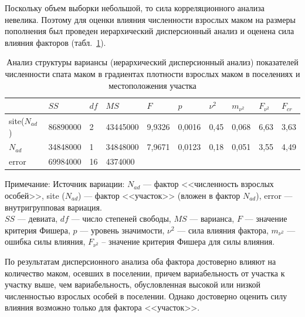 Поскольку объем выборки небольшой, то сила корреляционного анализа невелика. 
Поэтому для оценки влияния численности взрослых маком на размеры пополнения был проведен иерархический дисперсионный анализ и оценена сила влияния факторов (табл.~\ref{tab:ANOVA_site_Nad_spat}).
\begin{table}[p]
\caption{Анализ структуры вариансы (иерархический дисперсионный анализ) показателей численности спата маком в градиентах плотности взрослых маком в поселениях и местоположения участка}
\label{tab:ANOVA_site_Nad_spat}
\begin{center}
\begin{tabular}{|l|lll|ll|ll|ll|}
\hline
                & $SS$        & $df$ & $MS$       & $F$      & $p$        & $\nu^2$      & $m_{\nu^2}$       & $F_{\nu^2}$            & $F_{cr}$  \\ \hline
  site($N_{ad}$) & 86890000  & 2  & 43445000 & 9,9326 & 0,0016 & 0,45 & 0,068 & 6,63 & 3,63 \\
$N_{ad}$         & 34848000  & 1  & 34848000 & 7,9671 & 0,0123 & 0,18 & 0,051 & 3,55 & 4,49 \\
error       & 69984000  & 16 & 4374000  &        &          &              &              &              &      \\ \hline
\end{tabular}
\end{center}

\footnotesize{Примечание: Источник вариации: $N_{ad}$ --- фактор <<численность взрослых особей>>, 
site ($N_{ad}$) --- фактор <<участок>> (вложен в фактор $N_{ad}$),
error ---  внутригрупповая вариация. \\
$SS$ --- девиата, 
$df$ --- число степеней свободы, 
$MS$ --- варианса, 
$F$ --- значение критерия Фишера, 
$p$  --- уровень значимости,
$\nu^2$ --- сила влияния фактора,
$m_{\nu^2}$ --- ошибка силы влияния,
$F_{\nu^2}$ – значение критерия Фишера для силы влияния.}
\end{table}
По результатам дисперсионного анализа оба фактора достоверно влияют на количество маком, осевших в поселении, причем вариабельность от участка к участку выше, чем вариабельность, обусловленная высокой или низкой численностью взрослых особей в поселении. 
Однако достоверно оценить силу влияния возможно только для фактора <<участок>>.

